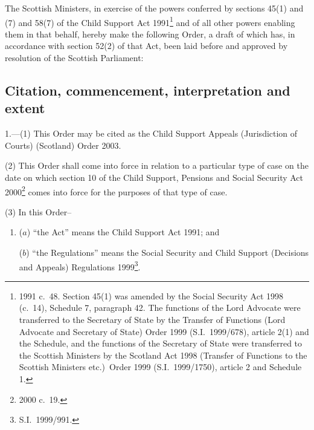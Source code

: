 \documentclass[12pt,a4paper]{article}
\title{\regstitle}
\author{S.S.I.\ 2003 No.\ 96}
\date{Made
18th February 2003\\
Coming into force
in accordance with article 1(2)
}
\begin{document}
\maketitle

\noindent
The Scottish Ministers, in exercise of the powers conferred by sections 45(1) and (7) and 58(7) of the Child Support Act 1991\footnote{1991 c.\ 48. Section 45(1) was amended by the Social Security Act 1998 (c.\ 14), Schedule 7, paragraph 42. The functions of the Lord Advocate were transferred to the Secretary of State by the Transfer of Functions (Lord Advocate and Secretary of State) Order 1999 (S.I.\ 1999/678), article 2(1) and the Schedule, and the functions of the Secretary of State were transferred to the Scottish Ministers by the Scotland Act 1998 (Transfer of Functions to the Scottish Ministers etc.)\ Order 1999 (S.I.\ 1999/1750), article 2 and Schedule 1.} and of all other powers enabling them in that behalf, hereby make the following Order, a draft of which has, in accordance with section 52(2) of that Act, been laid before and approved by resolution of the Scottish Parliament: 

{\sloppy

\tableofcontents

}

\bigskip

\setcounter{secnumdepth}{-2}

\subsection[1. Citation, commencement, interpretation and extent]{Citation, commencement, interpretation and extent}

1.---(1)  This Order may be cited as the Child Support Appeals (Jurisdiction of Courts) (Scotland) Order 2003.

(2) This Order shall come into force in relation to a particular type of case on the date on which section 10 of the Child Support, Pensions and Social Security Act 2000\footnote{2000 c.\ 19.} comes into force for the purposes of that type of case.

(3) In this Order–
\begin{enumerate}\item[]
($a$) “the Act” means the Child Support Act 1991; and

($b$) “the Regulations” means the Social Security and Child Support (Decisions and Appeals) Regulations 1999\footnote{S.I.\ 1999/991.}.
\end{enumerate}
\end{document}
